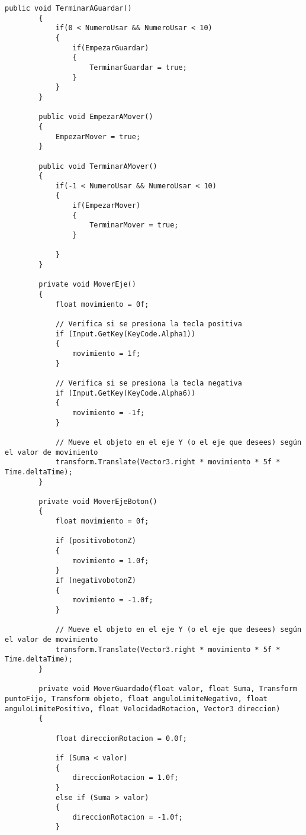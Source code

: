 \begin{lstlisting}[frame=single]
        public void TerminarAGuardar()
        {
            if(0 < NumeroUsar && NumeroUsar < 10)
            {
                if(EmpezarGuardar)
                {
                    TerminarGuardar = true;
                }
            }
        }
    
        public void EmpezarAMover()
        {
            EmpezarMover = true;
        }
    
        public void TerminarAMover()
        {
            if(-1 < NumeroUsar && NumeroUsar < 10)
            {
                if(EmpezarMover)
                {
                    TerminarMover = true;
                }
                
            }
        }
    
        private void MoverEje()
        {
            float movimiento = 0f;
    
            // Verifica si se presiona la tecla positiva
            if (Input.GetKey(KeyCode.Alpha1))
            {
                movimiento = 1f;
            }
    
            // Verifica si se presiona la tecla negativa
            if (Input.GetKey(KeyCode.Alpha6))
            {
                movimiento = -1f;
            }
    
            // Mueve el objeto en el eje Y (o el eje que desees) según el valor de movimiento
            transform.Translate(Vector3.right * movimiento * 5f * Time.deltaTime);
        }
    
        private void MoverEjeBoton()
        {
            float movimiento = 0f;
    
            if (positivobotonZ)
            {
                movimiento = 1.0f;
            }
            if (negativobotonZ)
            {
                movimiento = -1.0f;
            }
    
            // Mueve el objeto en el eje Y (o el eje que desees) según el valor de movimiento
            transform.Translate(Vector3.right * movimiento * 5f * Time.deltaTime);
        }
    
        private void MoverGuardado(float valor, float Suma, Transform puntoFijo, Transform objeto, float anguloLimiteNegativo, float anguloLimitePositivo, float VelocidadRotacion, Vector3 direccion)
        {
            
            float direccionRotacion = 0.0f;
    
            if (Suma < valor)
            {
                direccionRotacion = 1.0f;
            }
            else if (Suma > valor)
            {
                direccionRotacion = -1.0f;
            }
    

\end{lstlisting}
